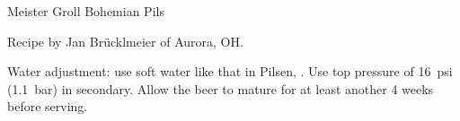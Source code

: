 \begin{recipe}{Meister Groll Bohemian Pils}

\begin{aboutblock}
Recipe by Jan Brücklmeier of Aurora, OH.\sourceaha
\end{aboutblock}


\begin{methodandtiming}
 
\begin{mashsteps}
\end{mashsteps}

\begin{fermentationsteps}
\end{fermentationsteps}

\begin{directions}
Water adjustment: use soft water like that in Pilsen, .
Use top pressure of 16~psi (1.1~bar) in secondary. Allow the beer to mature for at
least another 4 weeks before serving.
\end{directions}

\end{methodandtiming}

\recipebreak

\begin{ingredientsblock}

\begin{malts}
\end{malts}

\begin{hops}
\end{hops}


\end{ingredientsblock}

\end{recipe}

